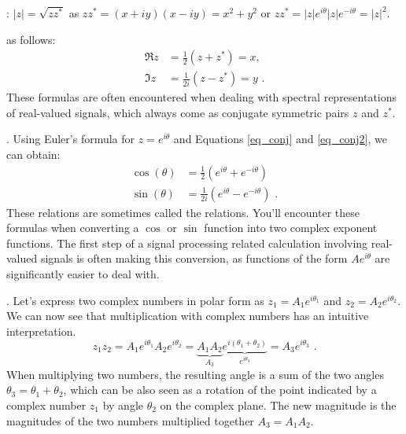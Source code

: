 : $|z| = \sqrt{z z^*}$ as $zz^*=(x+iy)(x-iy)=x^2+y^2$
or $zz^* = |z|e^{i\theta}|z|e^{-i\theta}=|z|^2$.

 as follows:
\begin{align}
\Re{z} &= \frac{1}{2}(z+z^*)=x,  \label{eq_conj} \\
\Im{z} &= \frac{1}{2i}(z-z^*)=y \,\,. \label{eq_conj2}
\end{align}
These formulas are often encountered when dealing with spectral representations of real-valued signals, which always come as conjugate symmetric pairs $z$ and $z^*$.

. Using Euler's formula for $z=e^{i\theta}$ and Equations \ref{eq_conj} and \ref{eq_conj2}, we can obtain:
\begin{align}
\cos(\theta) &= \frac{1}{2}\left(e^{i\theta} + e^{-i\theta}\right) \label{inveul0}\\
\sin(\theta) &= \frac{1}{2i}\left(e^{i\theta} - e^{-i\theta}\right)\,\,. \label{inveul}
\end{align}
These relations are sometimes called the \emph{} relations. You'll encounter these formulas when converting a $\cos$ or $\sin$ function into two complex exponent functions. The first step of a signal processing related calculation involving real-valued signals is often making this conversion, as functions of the form $A e^{i\theta}$ are significantly easier to deal with.

. Let's express two complex numbers in polar form as $z_1=A_1e^{i\theta_1}$ and $z_2=A_2e^{i\theta_2}$. We can now see that multiplication with complex numbers has an intuitive interpretation.
\begin{equation}
z_1 z_2 = A_1 e^{i\theta_1} A_2 e^{i\theta_2} = \underbrace{A_1
A_2}_{A_3} \underbrace{e^{i(\theta_1 + \theta_2)}}_{e^{i\theta_3}} =
A_3 e^{i\theta_3} \,\,.
\end{equation}
When multiplying two numbers, the resulting angle is a sum of the two angles $\theta_3=\theta_1 + \theta_2$, which can be also seen as a rotation of the point indicated by a complex number $z_1$ by angle $\theta_2$ on the complex plane. The new magnitude is the magnitudes of the two numbers multiplied together $A_3=A_1A_2$.

